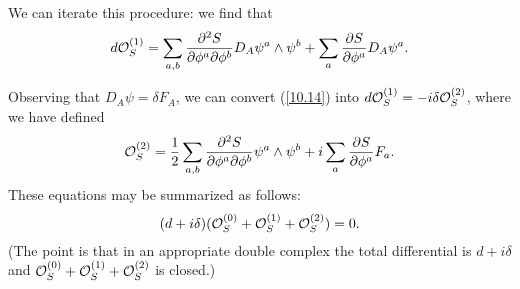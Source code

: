 \documentclass[12pt]{article}
\begin{document}
We can iterate this procedure: we find that
\begin{equation} \labell{10.14}
 d \opsone = \sum_{a,b} \frac{\partial^2 S}{\partial \phi^a \partial \phi^b}
D_A \psi^a \wedge \psi^b  + \sum_a \frac{\partial S}{\partial \phi^a} 
D_A \psi^a.
\end{equation}

Observing that $D_A \psi = \delta F_A$, we can convert (\ref{10.14}) into
$ d {\cal O}_S^{(1)} = - i \delta {\cal O}_S^{(2)}$, where
we have defined
\begin{equation} \labell{10.15}
\opstwo = \frac{1}{2} \sum_{a,b} 
 \frac{\partial^2 S}{\partial \phi^a \partial \phi^b}
 \psi^a \wedge \psi^b  + i  \sum_a \frac{\partial S}{\partial \phi^a} F_a.
\end{equation}
\newcommand{\que}[2]{Q_{#1}^{(#2)} }
These equations may be summarized as follows:
\begin{equation} \labell{10.16}
 (d + i \delta) (\opso + \opsone + \opstwo) = 0. \end{equation}
(The point is that in an appropriate double complex
the total differential is $d + i\delta$ and 
${\cal O}_S^{(0)} + {\cal O}_S^{(1)} + {\cal O}_S^{(2)} $ is closed.)
\end{document}
